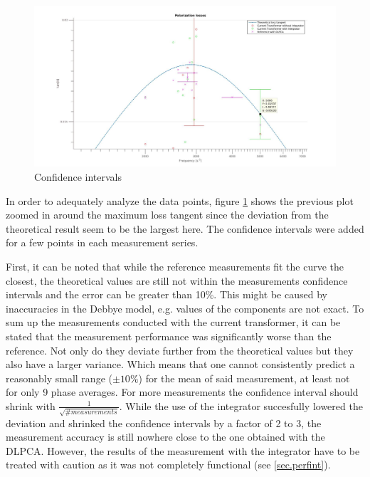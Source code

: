 \begin{figure}[htbp]
 \centering
 \centerline{\includegraphics[width=\textwidth]{figures/Results/Spectroscopy/errorbarsbettercolor}}

\caption[Kurze Abbildungsbeschreibung]{Confidence intervals}
\label{fig.spectroscopy2}
\end{figure}

In order to adequately analyze the data points, figure \ref{fig.spectroscopy2} shows the previous plot
zoomed in around the maximum loss tangent since the deviation from the theoretical result seem to be the largest here.
The confidence intervals were added for a few points in each measurement series.

First, it can be noted that while the reference measurements fit the curve the closest, the theoretical values are still not
within the measurements confidence intervals and the error can be greater than 10\%. This might be caused by inaccuracies in the Debbye model, e.g. values of the components are not exact. To sum up the measurements conducted with
the current transformer, it can be stated that the measurement performance was significantly worse than the reference. Not only do they deviate further from the theoretical values
but they also have a larger variance. Which means that one cannot consistently predict a reasonably small range ($\pm 10 \%$) for the mean of said measurement, at least not for only 9 phase averages. For more measurements the confidence interval should shrink with $\frac{1}{\sqrt{\# measurements}}$. 
While the use of the integrator succesfully lowered the deviation and shrinked the confidence intervals by a factor of 2 to 3, the measurement accuracy is still nowhere close to the one obtained with the DLPCA. However, the results of the measurement with the integrator have to be treated with caution as it was not completely functional (see \ref{sec.perfint}). 

